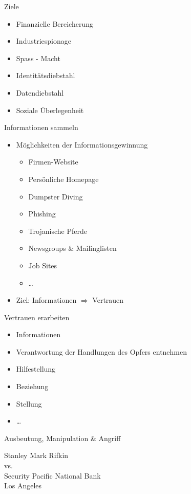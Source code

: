 \documentclass[11pt]{beamer}
\begin{document}
\begin{frame}{Ziele}
  \begin{itemize}
    \item Finanzielle Bereicherung
    \item Industriespionage
    \item Spass - Macht
    \item Identitätsdiebstahl
    \item Datendiebstahl
    \item Soziale Überlegenheit
  \end{itemize}
\end{frame}

\begin{frame}{Informationen sammeln}
  \begin{itemize}
    \item Möglichkeiten der Informationsgewinnung
      \begin{itemize}
      \item Firmen-Website
      \item Persönliche Homepage
      \item Dumpster Diving
      \item Phishing
      \item Trojanische Pferde
      \item Newsgroups \& Mailinglisten
      \item Job Sites
      \item \dots
      \end{itemize}
    \item Ziel: Informationen $\Rightarrow$ Vertrauen
  \end{itemize}
\end{frame}

\begin{frame}{Vertrauen erarbeiten}
  \begin{itemize}
    \item Informationen
    \item Verantwortung der Handlungen des Opfers entnehmen
    \item Hilfestellung
    \item Beziehung
    \item Stellung
    \item \dots
  \end{itemize}
\end{frame}

\begin{frame}{Ausbeutung, Manipulation \& Angriff}
  \begin{center}
  {\Large
  Stanley Mark Rifkin\\
  vs.\\
  Security Pacific National Bank\\
  Los Angeles
  }
  \end{center}
\end{frame}
\end{document}
